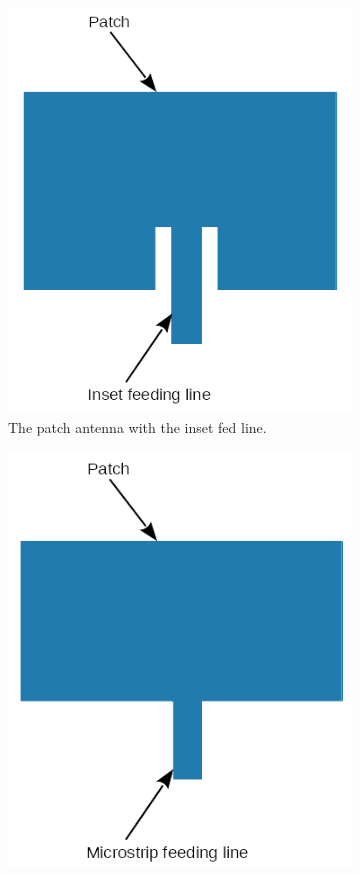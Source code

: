 \documentclass[12pt, oneandhalf, chaparabic, sees, ms]{metu}
\begin{document}
\begin{figure}[!htbp]
  \begin{subfigure}[b]{0.45\textwidth}
  \includegraphics[width=\textwidth]{inset-patch-tr.png}
   \caption{The patch antenna with the inset fed line.}
   \label{fig:inset}
  \end{subfigure}
  \hfill
  \begin{subfigure}[b]{0.45\textwidth}
  \includegraphics[width=\textwidth]{mstrip-patch-tr.png}

\end{subfigure}
\end{figure}
\end{document}
